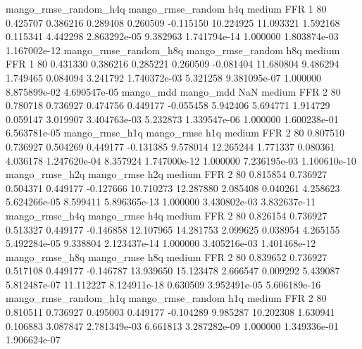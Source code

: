 mango_rmse_random_h4q mango_rmse_random                  h4q     medium      FFR                 1 80  0.425707       0.386216 0.289408       0.260509   -0.115150     10.224925     11.093321     1.592168       0.115341  4.442298 2.863292e-05     9.382963   1.741794e-14            1.000000    1.803874e-03        1.167002e-12
mango_rmse_random_h8q mango_rmse_random                  h8q     medium      FFR                 1 80  0.431330       0.386216 0.285221       0.260509   -0.081404     11.680804      9.486294     1.749465       0.084094  3.241792 1.740372e-03     5.321258   9.381095e-07            1.000000    8.875899e-02        4.690547e-05
            mango_mdd         mango_mdd                  NaN     medium      FFR                 2 80  0.780718       0.736927 0.474756       0.449177   -0.055458      5.942406      5.694771     1.914729       0.059147  3.019907 3.404763e-03     5.232873   1.339547e-06            1.000000    1.600238e-01        6.563781e-05
       mango_rmse_h1q        mango_rmse                  h1q     medium      FFR                 2 80  0.807510       0.736927 0.504269       0.449177   -0.131385      9.578014     12.265244     1.771337       0.080361  4.036178 1.247620e-04     8.357924   1.747000e-12            1.000000    7.236195e-03        1.100610e-10
       mango_rmse_h2q        mango_rmse                  h2q     medium      FFR                 2 80  0.815854       0.736927 0.504371       0.449177   -0.127666     10.710273     12.287880     2.085408       0.040261  4.258623 5.624266e-05     8.599411   5.896365e-13            1.000000    3.430802e-03        3.832637e-11
       mango_rmse_h4q        mango_rmse                  h4q     medium      FFR                 2 80  0.826154       0.736927 0.513327       0.449177   -0.146858     12.107965     14.281753     2.099625       0.038954  4.265155 5.492284e-05     9.338804   2.123437e-14            1.000000    3.405216e-03        1.401468e-12
       mango_rmse_h8q        mango_rmse                  h8q     medium      FFR                 2 80  0.839652       0.736927 0.517108       0.449177   -0.146787     13.939650     15.123478     2.666547       0.009292  5.439087 5.812487e-07    11.112227   8.124911e-18            0.630509    3.952491e-05        5.606189e-16
mango_rmse_random_h1q mango_rmse_random                  h1q     medium      FFR                 2 80  0.810511       0.736927 0.495003       0.449177   -0.104289      9.985287     10.202308     1.630941       0.106883  3.087847 2.781349e-03     6.661813   3.287282e-09            1.000000    1.349336e-01        1.906624e-07
